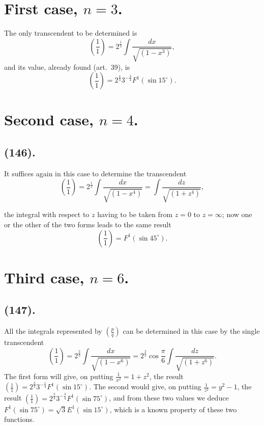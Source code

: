 \documentclass{article}
\begin{document}
\section*{First case, $n=3$.}

The only transcendent to be determined is
\[ \left(\frac{1}{1}\right)=2^{\frac{1}{3}}\int\frac{dx}{\sqrt{(1-x^{3})}}, \]
and its value, already found (art.\ 39), is
\[ \left(\frac{1}{1}\right)=2^{\frac{4}{3}}3^{-\frac{3}{4}}F^{1}(\sin 15^{\circ}). \]

\section*{Second case, $n=4$.}

\subsection*{(146).}

It suffices again in this case to determine the transcendent
\[ \left(\frac{1}{1}\right)=2^{\frac{1}{2}}\int\frac{dx}{\sqrt{(1-x^{4})}}=\int\frac{dz}{\sqrt{(1+z^{4})}}, \]

the integral with respect to $z$ having to be taken from $z=0$ to $z=\infty$; now one or the other of the two forms leads to the same result
\[ \left(\frac{1}{1}\right)=F^{1}(\sin 45^{\circ}). \]

\section*{Third case, $n=6$.}

\subsection*{(147).}

All the integrals represented by $\left(\frac{p}{q}\right)$ can be determined in this case by the single transcendent
\[ \left(\frac{1}{1}\right)=2^{\frac{2}{3}}\int\frac{dx}{\sqrt{(1-x^{6})}}=2^{\frac{2}{3}}\cos\frac{\pi}{6}\int\frac{dz}{\sqrt{(1+z^{6})}}. \]
The first form will give, on putting $\frac{1}{x^{2}}=1+z^{2}$, the result $\left(\frac{1}{1}\right)=2^{\frac{2}{3}}3^{-\frac{1}{4}}F^{1}(\sin 15^{\circ})$. The second would give, on putting $\frac{1}{z^{2}}=y^{2}-1$, the result $\left(\frac{1}{1}\right)=2^{\frac{2}{3}}3^{-\frac{3}{4}}F^{1}(\sin 75^{\circ})$, and from these two values we deduce $F^{1}(\sin 75^{\circ})=\sqrt{3}E^{1}(\sin 15^{\circ})$, which is a known property of these two functions.
\end{document}
